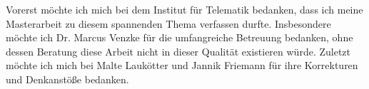 Vorerst möchte ich mich bei dem Institut für Telematik bedanken, dass ich meine Masterarbeit zu diesem spannenden Thema verfassen durfte.
Insbesondere möchte ich Dr. Marcus Venzke für die umfangreiche Betreuung bedanken, ohne dessen Beratung diese Arbeit nicht in dieser Qualität existieren würde.
Zuletzt möchte ich mich bei Malte Laukötter und Jannik Friemann für ihre Korrekturen und Denkanstöße bedanken.

